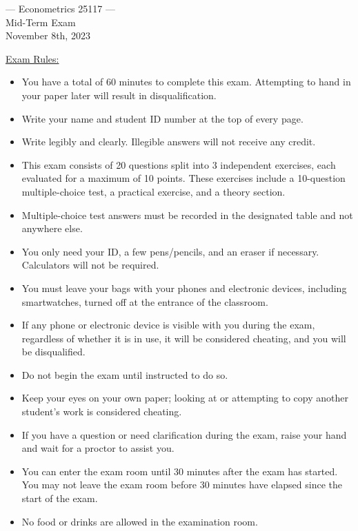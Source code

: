 \documentclass{article}
\begin{document}
\begin{center}
{\Large --- Econometrics 25117 --- \\[1em] Mid-Term Exam \\[1em] \small{November 8th, 2023}}\bigskip 
\end{center}
\vspace{1cm}
\underline{Exam Rules:}
\begin{itemize}
    \item You have a total of 60 minutes to complete this exam. Attempting to hand in your paper later will result in disqualification.
    \item Write your name and student ID number at the top of every page.
    \item Write legibly and clearly. Illegible answers will not receive any credit.
    \item This exam consists of 20 questions split into 3 independent exercises, each evaluated for a maximum of 10 points. These exercises include a 10-question multiple-choice test, a practical exercise, and a theory section.
    \item Multiple-choice test answers must be recorded in the designated table and not anywhere else.
    \item You only need your ID, a few pens/pencils, and an eraser if necessary. Calculators will not be required.
    \item You must leave your bags with your phones and electronic devices, including smartwatches, turned off at the entrance of the classroom.
    \item If any phone or electronic device is visible with you during the exam, regardless of whether it is in use, it will be considered cheating, and you will be disqualified.
    \item Do not begin the exam until instructed to do so.
    \item Keep your eyes on your own paper; looking at or attempting to copy another student's work is considered cheating.
    \item If you have a question or need clarification during the exam, raise your hand and wait for a proctor to assist you.
    \item You can enter the exam room until 30 minutes after the exam has started. You may not leave the exam room before 30 minutes have elapsed since the start of the exam.
    \item No food or drinks are allowed in the examination room.
\end{itemize}
\end{document}
